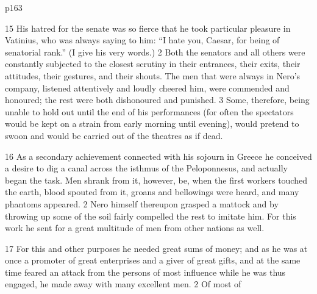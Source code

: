 p163

15
His hatred for the senate was so fierce that he took particular pleasure in Vatinius, who was always saying to him: ``I hate you, Caesar, for being of senatorial rank.'' (I give his very words.) 2 Both the senators and all others were constantly subjected to the closest scrutiny in their entrances, their exits, their attitudes, their gestures, and their shouts. The men that were always in Nero's company, listened attentively and loudly cheered him, were commended and honoured; the rest were both dishonoured and punished. 3 Some, therefore, being unable to hold out until the end of his performances (for often the spectators would be kept on a strain from early morning until evening), would pretend to swoon and would be carried out of the theatres as if dead.

16
As a secondary achievement connected with his sojourn in Greece he conceived a desire to dig a canal across the isthmus of the Peloponnesus, and actually began the task. Men shrank from it, however, be, when the first workers touched the earth, blood spouted from it, groans and bellowings were heard, and many phantoms appeared. 2 Nero himself thereupon grasped a mattock and by throwing up some of the soil fairly compelled the rest to imitate him. For this work he sent for a great multitude of men from other nations as well.

17
For this and other purposes he needed great sums of money; and as he was at once a promoter of great enterprises and a giver of great gifts, and at the same time feared an attack from the persons of most influence while he was thus engaged, he made away with many excellent men. 2 Of most of

